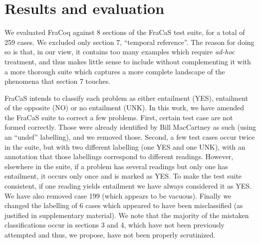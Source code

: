 \documentclass[11pt]{article}
\begin{document}
\section{Results and evaluation}

We evaluated FraCoq against 8 sections of the FraCaS test suite, for a
total of 259 cases. We excluded only section 7, ``temporal reference''. The reason for
doing so is that, in our view, it contains too many examples which
require \textit{ad-hoc} treatment, and thus makes little sense to
include without complementing it with a more thorough suite which
captures a more complete landscape of the phenomena that section 7
touches.

FraCaS intends to classify each problem as either entailment (YES),
entailment of the opposite (NO) or no entailment (UNK).  In this work,
we have amended the FraCaS suite to correct a few problems. First,
certain test case are not formed correctly. Those were already
identified by Bill MacCartney as such (using an ``undef''
labelling), and we removed those. Second, a few test cases occur twice
in the suite, but with two different labelling (one YES and one UNK),
with an annotation that those labellings correspond to different
readings. However, elsewhere in the suite, if a problem has several
readings but only one has entailment, it occurs only once and is
marked as YES. To make the test suite consistent, if one reading
yields entailment we have always considered it as YES. We have also
removed case 199 (which appears to be vacuous). Finally we changed the
labelling of 6 cases 
which appeared to have been
misclassified (as justified in supplementary material). We note that the majority of the mistaken
classifications occur in sections 3 and 4, which have not been
previously attempted and thus, we propose, have not been properly
scrutinized.
\end{document}
